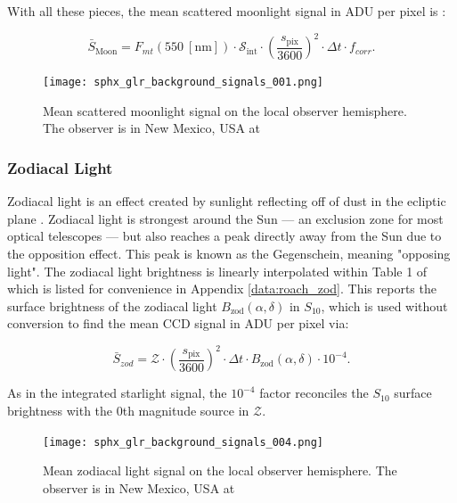 With all these pieces, the mean scattered moonlight signal in ADU per pixel is \cite{krag2003}:

\begin{equation} \label{eq:moonlight_adu}
  \bar{S}_\mathrm{Moon} = F_{mt}(550 \: \left[\textrm{nm}\right]) \cdot \mathcal{S}_\mathrm{int} \cdot \left( \frac{s_\mathrm{pix}}{3600} \right)^2 \cdot \Delta t \cdot f_{corr}.
\end{equation}

\begin{figure}[ht]
  \centering
  \texttt{[image: sphx\_glr\_background\_signals\_001.png]}
  \caption{Mean scattered moonlight signal on the local observer hemisphere. The observer is in New Mexico, USA at
  \pogslla}
  \label{fig:moonlight_hemi}
\end{figure}

\subsubsection{Zodiacal Light}

Zodiacal light is an effect created by sunlight reflecting off of dust in the ecliptic plane \cite{krag2003}. Zodiacal light is strongest around the Sun --- an exclusion zone for most optical telescopes --- but also reaches a peak directly away from the Sun due to the opposition effect. This peak is known as the Gegenschein, meaning "opposing light". The zodiacal light brightness is linearly interpolated within Table 1 of \cite{roach1972} which is listed for convenience in Appendix \ref{data:roach_zod}. This reports the surface brightness of the zodiacal light $B_\mathrm{zod}(\alpha, \delta)$ in $S_{10}$, which is used without conversion to find the mean CCD signal in ADU per pixel via:

\begin{equation} \label{eq:zodiacal_adu}
  \bar{S}_{zod} = \mathcal{Z} \cdot \left( \frac{s_\mathrm{pix}}{3600} \right)^2 \cdot \Delta t \cdot B_\mathrm{zod}(\alpha, \delta) \cdot 10^{-4}.
\end{equation}

As in the integrated starlight signal, the $10^{-4}$ factor reconciles the $S_{10}$ surface brightness with the 0th magnitude source in $\mathcal{Z}$. 

\begin{figure}[ht]
  \centering
  \texttt{[image: sphx\_glr\_background\_signals\_004.png]}
  \caption{Mean zodiacal light signal on the local observer hemisphere. The observer is in New Mexico, USA at
  \pogslla}
  \label{fig:zod_hemi}
\end{figure}

